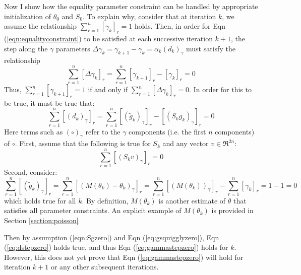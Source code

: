 \documentclass[letter,12pt]{article}
\begin{document}
Now I show how the equality parameter constraint can be handled by appropriate initialization of $\theta_0$ and $S_0$.  To explain why, consider that at iteration $k$, we assume the relationship $\sum_{r=1}^{n}[\gamma_{k}]_r=1$ holds.  Then, in order for Eqn (\ref{eqn:equalityconstraint}) to be satisfied at each successive iteration $k+1$, the step along the $\gamma$ parameters $\Delta \gamma_k = \gamma_{k+1} - \gamma_k = \alpha_k(d_k)_{\gamma}$ must satisfy the relationship
\begin{equation} \label{eq:gammastepzero}
\sum_{r=1}^{n} [\Delta \gamma_k]_r
=
\sum_{r=1}^{n}[\gamma_{k+1}]_r - [\gamma_k]_r
= 0
\end{equation}
Thus, $\sum_{r=1}^{n}[\gamma_{k+1}]_r=1$ if and only if $\sum_{r=1}^{n} [\Delta \gamma_k]_r = 0$.  In order for this to be true, it must be true that:
\begin{equation} \label{eq:dstepzero}
\sum_{r=1}^{n} [(d_k)_{\gamma}]_r
=
\sum_{r=1}^{n} [(\tilde{g}_k)_{\gamma}]_r - [(S_kg_k)_{\gamma}]_r = 0
\end{equation}
Here terms such as $(\circ)_{\gamma}$ refer to the $\gamma$ components (i.e. the first $n$ components) of $\circ$.  First, assume that the following is true for $S_{k}$ and any vector $v \in \Re^{2n}$:
\begin{equation} \label{eqn:Sgzero}
\sum_{r=1}^{n} [(S_{k}v)_{\gamma}]_r = 0
\end{equation}
Second, consider:
\begin{equation} \label{eq:gsquigglyzero}
\sum_{r=1}^{n} [(\tilde{g}_k)_{\gamma}]_r
=
\sum_{r=1}^{n} [(M(\theta_k) - \theta_k)_{\gamma}]_r
=
\sum_{r=1}^{n} [(M(\theta_k))_{\gamma}]_r - \sum_{r=1}^{n} [\gamma_k]_r = 1 - 1 = 0
\end{equation}
which holds true for all $k$.  By definition, $M(\theta_k)$ is another estimate of $\theta$ that satisfies all parameter constraints.  An explicit example of $M(\theta_k)$ is provided in Section \ref{section:poisson}

Then by assumption (\ref{eqn:Sgzero}) and Eqn (\ref{eq:gsquigglyzero}), Eqn (\ref{eq:dstepzero}) holds true, and thus Eqn (\ref{eq:gammastepzero}) holds for $k$.  However, this does not yet prove that Eqn (\ref{eq:gammastepzero}) will hold for iteration $k+1$ or any other subsequent iterations.  
\end{document}

